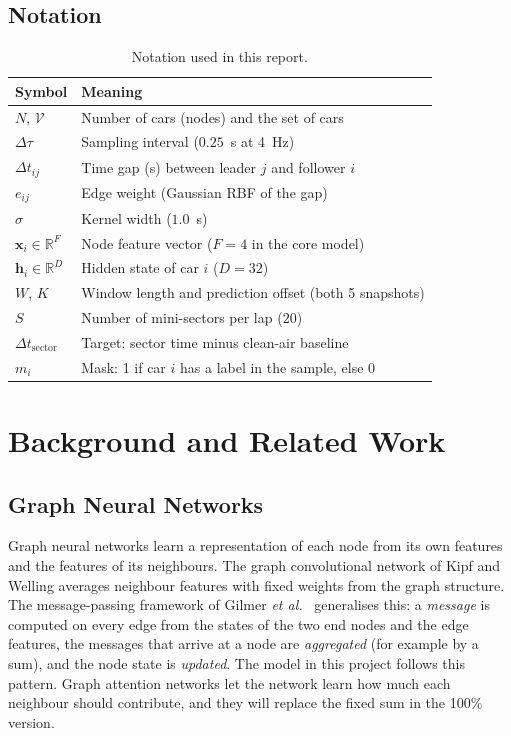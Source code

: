 \documentclass[11pt,a4paper]{article}
\newcommand{\dt}{\Delta t}
\begin{document}
\subsection{Notation}
\begin{table}[H]
\centering
\caption{Notation used in this report.}
\label{tab:notation}
\small
\begin{tabularx}{\linewidth}{@{}lX@{}}
\toprule
\textbf{Symbol} & \textbf{Meaning} \\
\midrule
$N$, $\mathcal{V}$ & Number of cars (nodes) and the set of cars \\
$\Delta\tau$ & Sampling interval ($0.25$~s at 4~Hz) \\
$\dt_{ij}$ & Time gap (s) between leader $j$ and follower $i$ \\
$e_{ij}$ & Edge weight (Gaussian RBF of the gap) \\
$\sigma$ & Kernel width ($1.0$~s) \\
$\mathbf{x}_i \in \mathbb{R}^{F}$ & Node feature vector ($F=4$ in the core model) \\
$\mathbf{h}_i \in \mathbb{R}^{D}$ & Hidden state of car $i$ ($D=32$) \\
$W$, $K$ & Window length and prediction offset (both 5 snapshots) \\
$S$ & Number of mini-sectors per lap ($20$) \\
$\Delta t_{\text{sector}}$ & Target: sector time minus clean-air baseline \\
$m_i$ & Mask: 1 if car $i$ has a label in the sample, else 0 \\
\bottomrule
\end{tabularx}
\end{table}

\section{Background and Related Work}
\label{sec:background}

\subsection{Graph Neural Networks}
Graph neural networks learn a representation of each node from its own
features and the features of its neighbours. The graph convolutional network
of Kipf and Welling \cite{kipf2017} averages neighbour features with fixed
weights from the graph structure. The message-passing framework of Gilmer
\emph{et al.}\ \cite{gilmer2017} generalises this: a \emph{message} is computed
on every edge from the states of the two end nodes and the edge features, the
messages that arrive at a node are \emph{aggregated} (for example by a sum),
and the node state is \emph{updated}. The model in this project follows this
pattern. Graph attention networks \cite{velickovic2018} let the network learn
how much each neighbour should contribute, and they will replace the fixed
sum in the 100\% version.
\end{document}
